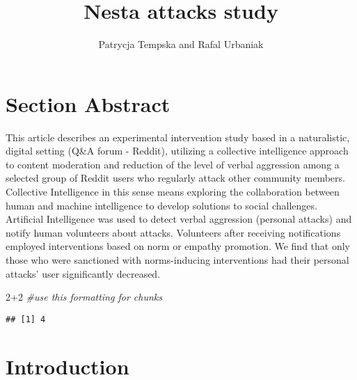 \documentclass[
  10pt,
  dvipsnames,enabledeprecatedfontcommands]{scrartcl}
\title{Nesta attacks study}
\author{Patrycja Tempska and Rafal Urbaniak}
\date{}
\newenvironment{Shaded}{\begin{snugshade}}{\end{snugshade}}
\newcommand{\CommentTok}[1]{\textcolor[rgb]{0.56,0.35,0.01}{\textit{#1}}}
\newcommand{\DecValTok}[1]{\textcolor[rgb]{0.00,0.00,0.81}{#1}}
\newcommand{\SpecialCharTok}[1]{\textcolor[rgb]{0.00,0.00,0.00}{#1}}
\begin{document}
\maketitle

\tableofcontents

\hypertarget{section-abstract}{%
\section{Section Abstract}\label{section-abstract}}

This article describes an experimental intervention study based in a
naturalistic, digital setting (Q\&A forum - Reddit), utilizing a
collective intelligence approach to content moderation and reduction of
the level of verbal aggression among a selected group of Reddit users
who regularly attack other community members. Collective Intelligence in
this sense means exploring the collaboration between human and machine
intelligence to develop solutions to social challenges. Artificial
Intelligence was used to detect verbal aggression (personal attacks) and
notify human volunteers about attacks. Volunteers after receiving
notifications employed interventions based on norm or empathy promotion.
We find that only those who were sanctioned with norms-inducing
interventions had their personal attacks' user significantly decreased.

\vspace{1mm}
\footnotesize

\begin{Shaded}
\begin{Highlighting}[]
\DecValTok{2}\SpecialCharTok{+}\DecValTok{2} \CommentTok{\#use this formatting for chunks}
\end{Highlighting}
\end{Shaded}

\begin{verbatim}
## [1] 4
\end{verbatim}

\normalsize

\hypertarget{introduction}{%
\section{Introduction}\label{introduction}}
\end{document}
